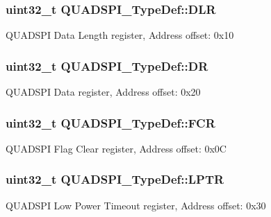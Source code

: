 \subsubsection[{\texorpdfstring{D\+LR}{DLR}}]{ uint32\+\_\+t Q\+U\+A\+D\+S\+P\+I\+\_\+\+Type\+Def\+::\+D\+LR}\hypertarget{struct_q_u_a_d_s_p_i___type_def_a3993f6897eafcd53b3d9246f970da991}{}\label{struct_q_u_a_d_s_p_i___type_def_a3993f6897eafcd53b3d9246f970da991}
Q\+U\+A\+D\+S\+PI Data Length register, Address offset\+: 0x10 
\subsubsection[{\texorpdfstring{DR}{DR}}]{ uint32\+\_\+t Q\+U\+A\+D\+S\+P\+I\+\_\+\+Type\+Def\+::\+DR}\hypertarget{struct_q_u_a_d_s_p_i___type_def_ae38590143dc85226183510790dda3475}{}\label{struct_q_u_a_d_s_p_i___type_def_ae38590143dc85226183510790dda3475}
Q\+U\+A\+D\+S\+PI Data register, Address offset\+: 0x20 
\subsubsection[{\texorpdfstring{F\+CR}{FCR}}]{ uint32\+\_\+t Q\+U\+A\+D\+S\+P\+I\+\_\+\+Type\+Def\+::\+F\+CR}\hypertarget{struct_q_u_a_d_s_p_i___type_def_ace4b7e4af14eec39dec9575d43d28d84}{}\label{struct_q_u_a_d_s_p_i___type_def_ace4b7e4af14eec39dec9575d43d28d84}
Q\+U\+A\+D\+S\+PI Flag Clear register, Address offset\+: 0x0C 
\subsubsection[{\texorpdfstring{L\+P\+TR}{LPTR}}]{ uint32\+\_\+t Q\+U\+A\+D\+S\+P\+I\+\_\+\+Type\+Def\+::\+L\+P\+TR}\hypertarget{struct_q_u_a_d_s_p_i___type_def_aaa464abb172a98c828d889240bde0fc9}{}\label{struct_q_u_a_d_s_p_i___type_def_aaa464abb172a98c828d889240bde0fc9}
Q\+U\+A\+D\+S\+PI Low Power Timeout register, Address offset\+: 0x30 
